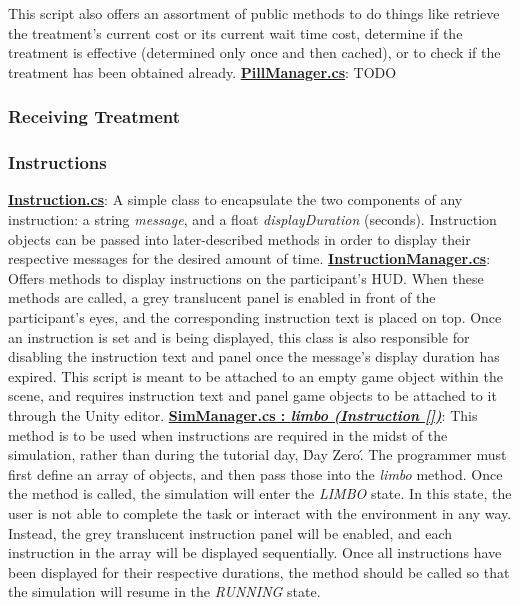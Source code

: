 \documentclass{article}
\begin{document}
This script also offers an assortment of public methods to do things like retrieve the treatment's current cost or its current wait time cost, determine if the treatment is effective (determined only once and then cached), or to check if the treatment has been obtained already. \newline \newline
\href{https://bit.ly/2JDPChz}{\textbf{PillManager.cs}}: TODO 

\subsubsection*{Receiving Treatment} %


\subsubsection*{Instructions} %
\href{https://bit.ly/2JFHEED}{\textbf{Instruction.cs}}: A simple class to encapsulate the two components of any instruction: a string \textit{message}, and a float \textit{displayDuration} (seconds). Instruction objects can be passed into later-described methods in order to display their respective messages for the desired amount of time. \newline \newline
\href{https://bit.ly/2TzLE9i}{\textbf{InstructionManager.cs}}: Offers methods to display instructions on the participant's HUD. When these methods are called, a grey translucent panel is enabled in front of the participant's eyes, and the corresponding instruction text is placed on top. Once an instruction is set and is being displayed, this class is also responsible for disabling the instruction text and panel once the message's display duration has expired. This script is meant to be attached to an empty game object within the scene, and requires instruction text and panel game objects to be attached to it through the Unity editor. \newline \newline
\href{https://bit.ly/2UhmSzq}{\textbf{SimManager.cs : \textit{limbo (Instruction [])}}}: This method is to be used when instructions are required in the midst of the simulation, rather than during the tutorial day, \'Day Zero\'. The programmer must first define an array of  objects, and then pass those into the \textit{limbo} method. Once the method is called, the simulation will enter the \textit{LIMBO} state. In this state, the user is not able to complete the task or interact with the environment in any way. Instead, the grey translucent instruction panel will be enabled, and each instruction in the array will be displayed sequentially. Once all instructions have been displayed for their respective durations, the  method should be called so that the simulation will resume in the \textit{RUNNING} state. \newline \newline
\end{document}
